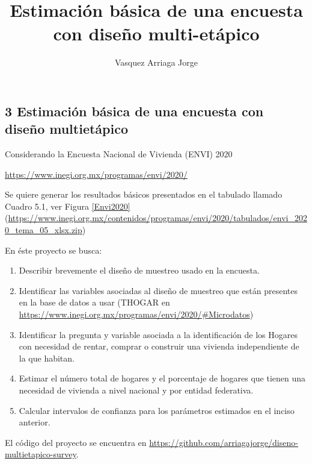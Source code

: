 \documentclass[
]{article}
\title{Estimación básica de una encuesta con diseño multi-etápico}
\author{Vasquez Arriaga Jorge}
\date{}
\providecommand{\tightlist}{%
  \setlength{\itemsep}{0pt}\setlength{\parskip}{0pt}}
\begin{document}
\maketitle


\hypertarget{estimaciuxf3n-buxe1sica-de-una-encuesta-con-diseuxf1o-multietuxe1pico}{%
\subsection{3 Estimación básica de una encuesta con diseño
multietápico}\label{estimaciuxf3n-buxe1sica-de-una-encuesta-con-diseuxf1o-multietuxe1pico}}

Considerando la Encuesta Nacional de Vivienda (ENVI) 2020

\url{https://www.inegi.org.mx/programas/envi/2020/}

Se quiere generar los resultados básicos
presentados en el tabulado llamado Cuadro 5.1, ver Figura \ref{Envi2020}
(\url{https://www.inegi.org.mx/contenidos/programas/envi/2020/tabulados/envi_2020_tema_05_xlsx.zip})

En éste proyecto se busca:

\begin{enumerate}
\def\labelenumi{\roman{enumi}.}
\tightlist
\item
  Describir brevemente el diseño de muestreo usado en la encuesta.
\item
  Identificar las variables asociadas al diseño de muestreo que están
  presentes en la base de datos a usar (THOGAR en
  \url{https://www.inegi.org.mx/programas/envi/2020/\#Microdatos})
\item
  Identificar la pregunta y variable asociada a la identificación de los
  Hogares con necesidad de rentar, comprar o construir una vivienda
  independiente de la que habitan.
\item
  Estimar el número total de hogares y el porcentaje de hogares que tienen una necesidad de vivienda a nivel nacional y por entidad federativa.
\item
  Calcular intervalos de confianza para los parámetros estimados en el inciso anterior.
\end{enumerate}

El código del proyecto se encuentra en \href{https://github.com/arriagajorge/diseno-multietapico-survey}{https://github.com/arriagajorge/diseno-multietapico-survey}.
\end{document}
